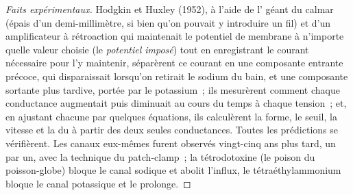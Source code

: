 \begin{proof}[Faits expérimentaux]
Hodgkin et Huxley (1952), à l'aide de l' géant du calmar (épais
d'un demi-millimètre, si bien qu'on pouvait y introduire un fil) et d'un
amplificateur à rétroaction qui maintenait le potentiel de membrane à
n'importe quelle valeur choisie (le \emph{potentiel imposé}) tout en
enregistrant le courant nécessaire pour l'y maintenir, séparèrent ce
courant en une composante entrante précoce, qui disparaissait lorsqu'on
retirait le sodium du bain, et une composante sortante plus tardive,
portée par le potassium~; ils mesurèrent comment chaque conductance
augmentait puis diminuait au cours du temps à chaque tension~; et, en
ajustant chacune par quelques équations, ils calculèrent la forme, le
seuil, la vitesse et la  du  à
partir des deux seules conductances. Toutes les prédictions se
vérifièrent. Les canaux eux-mêmes furent observés vingt-cinq ans plus
tard, un par un, avec la technique du patch-clamp~; la tétrodotoxine (le
poison du poisson-globe) bloque le canal sodique et abolit l'influx, le
tétraéthylammonium bloque le canal potassique et le prolonge.
\end{proof}

